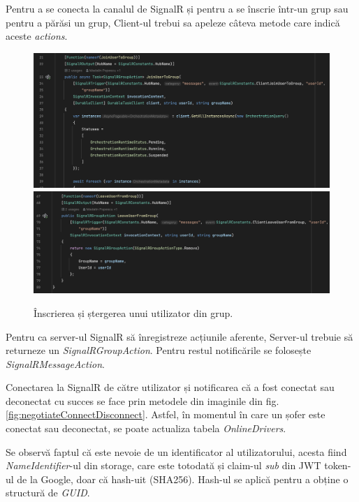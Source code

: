 Pentru a se conecta la canalul de SignalR și pentru a se înscrie într-un grup sau pentru
a părăsi un grup, Client-ul trebui sa apeleze câteva metode care indică aceste \textit{actions}.

\begin{figure}[H]
    \centering
    \includegraphics[width=16cm]{Assets/JoinUser.png}
    \includegraphics[width=16cm]{Assets/RemoveUser.png}
    \caption{Înscrierea și ștergerea unui utilizator din grup.}
    \label{fig:JoinRemoveUser}
\end{figure}

Pentru ca server-ul SignalR să înregistreze acțiunile aferente, Server-ul 
trebuie să returneze un \textit{SignalRGroupAction}. Pentru restul notificările 
se folosește \textit{SignalRMessageAction}.

Conectarea la SignalR de către utilizator și notificarea că a fost conectat sau 
deconectat cu succes se face prin metodele din imaginile din fig. \ref{fig:negotiateConnectDisconnect}.
Astfel, în momentul în care un șofer este conectat sau deconectat, se poate actualiza
tabela \textit{OnlineDrivers}.

Se observă faptul că este nevoie de un identificator al utilizatorului, acesta fiind \textit{NameIdentifier}-ul
din storage, care este totodată și claim-ul \textit{sub} din JWT token-ul de la Google, doar că hash-uit (SHA256).
Hash-ul se aplică pentru a obține o structură de \textit{GUID}.

